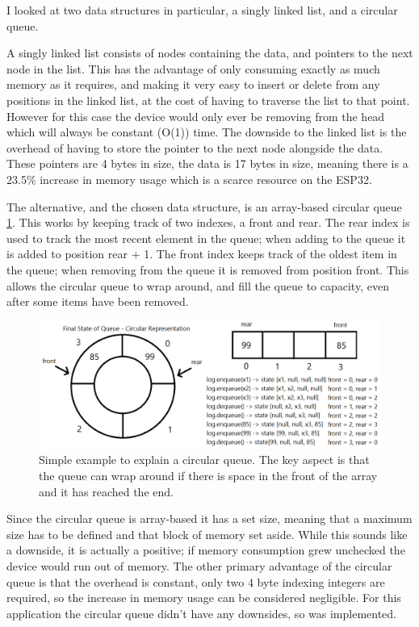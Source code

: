 \documentclass{l4proj}
\begin{document}
I looked at two data structures in particular, a singly linked list, and a circular queue.

A singly linked list consists of nodes containing the data, and pointers to the next node in the list. This has the advantage of only consuming exactly as much memory as it requires, and making it very easy to insert or delete from any positions in the linked list, at the cost of having to traverse the list to that point. However for this case the device would only ever be removing from the head which will always be constant (O(1)) time. The downside to the linked list is the overhead of having to store the pointer to the next node alongside the data. These pointers are 4 bytes in size, the data is 17 bytes in size, meaning there is a 23.5\% increase in memory usage which is a scarce resource on the ESP32.

The alternative, and the chosen data structure, is an array-based circular queue \ref{fig:circular_queue}. This works by keeping track of two indexes, a front and rear. The rear index is used to track the most recent element in the queue; when adding to the queue it is added to position rear + 1. The front index keeps track of the oldest item in the queue; when removing from the queue it is removed from position front. This allows the circular queue to wrap around, and fill the queue to capacity, even after some items have been removed.

\begin{figure}[!htb]
    \centering
    \includegraphics[width=1.0\linewidth]{images/circular_queue.png}

    \caption{ Simple example to explain a circular queue. The key aspect is that the queue can wrap around if there is space in the front of the array and it has reached the end. }

    \label{fig:circular_queue}
\end{figure}

Since the circular queue is array-based it has a set size, meaning that a maximum size has to be defined and that block of memory set aside. While this sounds like a downside, it is actually a positive; if memory consumption grew unchecked the device would run out of memory. The other primary advantage of the circular queue is that the overhead is constant, only two 4 byte indexing integers are required, so the increase in memory usage can be considered negligible. For this application the circular queue didn't have any downsides, so was implemented.
\end{document}
